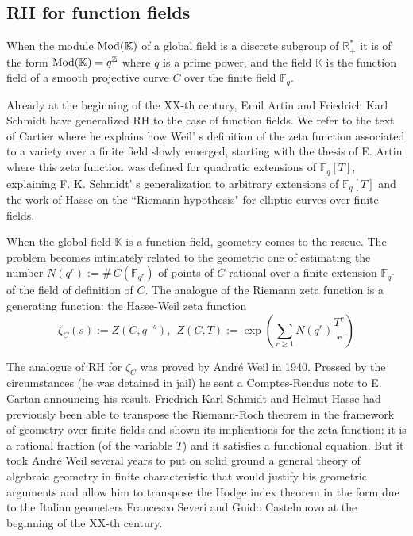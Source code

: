 \documentclass[12pt]{article}
\def\mmod{{\rm Mod}}
\def\F{{\mathbb F}}
\def\K{{\mathbb K}}
\def\R{{\mathbb R}}
\def\Z{{\mathbb Z}}
\begin{document}
\subsection{RH for function fields}
\label{subsecff}

When the module $\mmod(\K)$ of a global field is a discrete subgroup of $ \R_+^*$ it is of the form $\mmod(\K)=q^\Z$ where $q$ is a prime power, and the field $\K$ is the function field of a smooth projective curve $C$ over the finite field $\F_q$. 

Already at the beginning of the XX-th century, Emil Artin and Friedrich Karl Schmidt have generalized RH to the case of function fields. 
We refer to the text of Cartier \cite{Cart}  where he explains how Weil' \!\!s definition of the zeta function associated to a variety over a finite field slowly emerged, starting with the thesis of E. Artin where this zeta function was defined for quadratic extensions of $\F_q[T]$, explaining F. K. Schmidt' \!\!s generalization to arbitrary extensions of $\F_q[T]$ and the work of Hasse on the ``Riemann hypothesis" for elliptic curves over finite fields.

 When the global field $\K$ is a function field, geometry comes to the rescue.  The problem becomes intimately related to the geometric one of estimating the number $N(q^r):=\#\,C(\F_{q^r})$ of points of $C$ rational over a finite extension $\F_{q^r}$ of the field of definition of $C$. The analogue of the Riemann zeta function is a generating function: the Hasse-Weil zeta function   
\begin{equation}\label{HW}
\zeta_C(s):=Z(C,q^{-s}), \ \  Z(C,T) := \exp\left(\sum_{r\geq 1}N(q^r)\frac{T^r}{r}\right)
\end{equation}

The analogue of RH for $\zeta_C$ was proved by  Andr\' e Weil in 1940. Pressed by the circumstances (he was detained in jail) he sent a Comptes-Rendus note to E. Cartan announcing his result. Friedrich Karl Schmidt  and Helmut Hasse had previously been able to transpose the Riemann-Roch theorem in the framework of geometry over finite fields and shown its implications for the zeta function: it is a rational fraction (of the variable $T$) and it satisfies a functional equation. But it took Andr\'e Weil several years  to put on solid ground a general theory of algebraic geometry in finite characteristic that would justify his geometric arguments and  allow him to 
transpose the Hodge index theorem in the form due to the Italian geometers  Francesco Severi and Guido Castelnuovo at the beginning of the  XX-th century.
\end{document}
